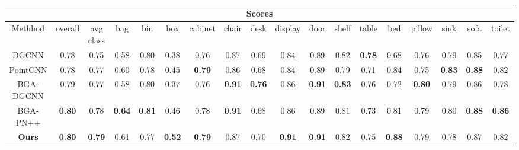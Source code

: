 \documentclass[journal,twoside]{IEEEtran}
\begin{document}
\begin{table*}
\begin{center}
{\begin{tabular}{||c|c|c|c c c c c c c c c c c c c c c||}
\multicolumn{18}{||c||}{ Scores} \\ \hline
Methhod & overall  & avg class  & bag  & bin  & box  & cabinet & chair & desk & display & door & shelf & table & bed  & pillow & sink & sofa & toilet \\ \hline
DGCNN \cite{wang2019dynamic}  	&0.78 &0.75   &0.58	&0.80	&0.38	&0.76	&0.87	&0.69	&0.84	&0.89	&0.82	&\textbf{0.78}	&0.68	&0.76	&0.79	&0.85	&0.77\\ \hline
PointCNN \cite{li2018pointcnn}   &0.78 &0.77  &0.60	&0.78	&0.45	&\textbf{0.79}	&0.86	&0.68	&0.84	&0.89	&0.79	&0.71	&0.84	&0.75	&\textbf{0.83}	&\textbf{0.88}	&0.82 \\ \hline
BGA-DGCNN \cite{Uy_2019_ICCV} &0.79 &0.77 &0.58 &0.80 &0.37 &0.76 &\textbf{0.91}  &\textbf{0.76} &0.86 &\textbf{0.91} &\textbf{0.83} &0.76 &0.72 &\textbf{0.80} &0.79 &0.86 &0.78\\\hline
BGA-PN++ \cite{Uy_2019_ICCV} &\textbf{0.80} &0.78 &\textbf{0.64} &\textbf{0.81} &0.46 &0.78 &\textbf{0.91} &0.68 &0.86 &0.89 &0.81 &0.73 &0.81 &0.79 &0.80 &\textbf{0.88} &\textbf{0.86}\\\hline
\textbf{Ours}   &\textbf{0.80} &\textbf{0.79}   &0.61	&0.77	&\textbf{0.52}	&\textbf{0.79}	&0.87	&0.70	&\textbf{0.91}	&\textbf{0.91}	&0.82	&0.75	&\textbf{0.88}	&0.79	&0.78	&0.87	&0.82
\\ \hline
\end{tabular}
\label{tab:scanobjectnn}
}
\end{center}
\end{table*}
\end{document}
